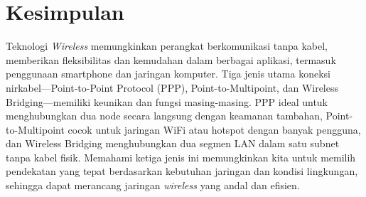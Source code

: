 \section*{Kesimpulan}

Teknologi \textit{Wireless} memungkinkan perangkat berkomunikasi tanpa kabel, memberikan fleksibilitas dan kemudahan dalam berbagai aplikasi, termasuk penggunaan smartphone dan jaringan komputer. Tiga jenis utama koneksi nirkabel—Point-to-Point Protocol (PPP), Point-to-Multipoint, dan Wireless Bridging—memiliki keunikan dan fungsi masing-masing. PPP ideal untuk menghubungkan dua node secara langsung dengan keamanan tambahan, Point-to-Multipoint cocok untuk jaringan WiFi atau hotspot dengan banyak pengguna, dan Wireless Bridging menghubungkan dua segmen LAN dalam satu subnet tanpa kabel fisik. Memahami ketiga jenis ini memungkinkan kita untuk memilih pendekatan yang tepat berdasarkan kebutuhan jaringan dan kondisi lingkungan, sehingga dapat merancang jaringan \textit{wireless} yang andal dan efisien.

